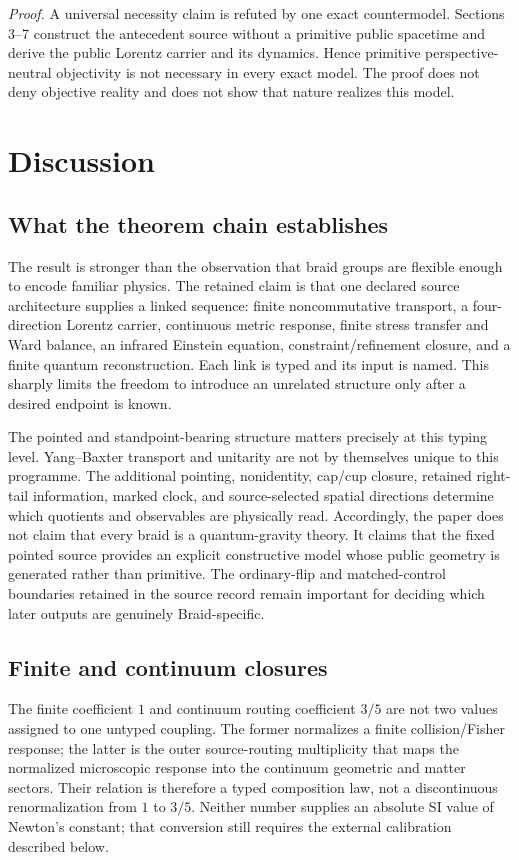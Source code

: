 \documentclass[11pt]{article}
\theoremstyle{definition}
\theoremstyle{remark}
\begin{document}
\textit{Proof.} A universal necessity claim is refuted by one exact countermodel. Sections 3--7 construct the antecedent source without a primitive public spacetime and derive the public Lorentz carrier and its dynamics. Hence primitive perspective-neutral objectivity is not necessary in every exact model. The proof does not deny objective reality and does not show that nature realizes this model.

\section{Discussion}

\subsection{What the theorem chain establishes}

The result is stronger than the observation that braid groups are flexible
enough to encode familiar physics. The retained claim is that one declared
source architecture supplies a linked sequence: finite noncommutative
transport, a four-direction Lorentz carrier, continuous metric response,
finite stress transfer and Ward balance, an infrared Einstein equation,
constraint/refinement closure, and a finite quantum reconstruction. Each link
is typed and its input is named. This sharply limits the freedom to introduce
an unrelated structure only after a desired endpoint is known.

The pointed and standpoint-bearing structure matters precisely at this typing
level. Yang--Baxter transport and unitarity are not by themselves unique to
this programme. The additional pointing, nonidentity, cap/cup closure, retained
right-tail information, marked clock, and source-selected spatial directions
determine which quotients and observables are physically read. Accordingly,
the paper does not claim that every braid is a quantum-gravity theory. It
claims that the fixed pointed source provides an explicit constructive model
whose public geometry is generated rather than primitive. The ordinary-flip
and matched-control boundaries retained in the source record remain important
for deciding which later outputs are genuinely Braid-specific.

\subsection{Finite and continuum closures}

The finite coefficient $1$ and continuum routing coefficient $3/5$ are not two
values assigned to one untyped coupling. The former normalizes a finite
collision/Fisher response; the latter is the outer source-routing multiplicity
that maps the normalized microscopic response into the continuum geometric
and matter sectors. Their relation is therefore a typed composition law, not
a discontinuous renormalization from $1$ to $3/5$. Neither number supplies an
absolute SI value of Newton's constant; that conversion still requires the
external calibration described below.
\end{document}
